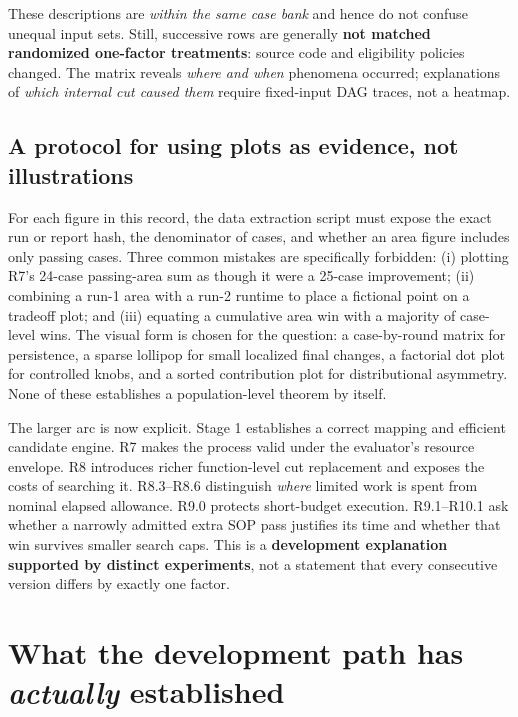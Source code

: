These descriptions are \emph{within the same case bank} and hence do not confuse unequal input sets. Still, successive rows are generally \textbf{not matched randomized one-factor treatments}: source code and eligibility policies changed. The matrix reveals \emph{where and when} phenomena occurred; explanations of \emph{which internal cut caused them} require fixed-input DAG traces, not a heatmap.

\subsection{A protocol for using plots as evidence, not illustrations}\label{a-protocol-for-using-plots-as-evidence-not-illustrations}

For each figure in this record, the data extraction script must expose the exact run or report hash, the denominator of cases, and whether an area figure includes only passing cases. Three common mistakes are specifically forbidden: (i) plotting R7's 24-case passing-area sum as though it were a 25-case improvement; (ii) combining a run-1 area with a run-2 runtime to place a fictional point on a tradeoff plot; and (iii) equating a cumulative area win with a majority of case-level wins. The visual form is chosen for the question: a case-by-round matrix for persistence, a sparse lollipop for small localized final changes, a factorial dot plot for controlled knobs, and a sorted contribution plot for distributional asymmetry. None of these establishes a population-level theorem by itself.

The larger arc is now explicit. Stage 1 establishes a correct mapping and efficient candidate engine. R7 makes the process valid under the evaluator's resource envelope. R8 introduces richer function-level cut replacement and exposes the costs of searching it. R8.3--R8.6 distinguish \emph{where} limited work is spent from nominal elapsed allowance. R9.0 protects short-budget execution. R9.1--R10.1 ask whether a narrowly admitted extra SOP pass justifies its time and whether that win survives smaller search caps. This is a \textbf{development explanation supported by distinct experiments}, not a statement that every consecutive version differs by exactly one factor.



\section{\texorpdfstring{What the development path has \emph{actually} established}{What the development path has actually established}}\label{what-the-development-path-has-actually-established}

